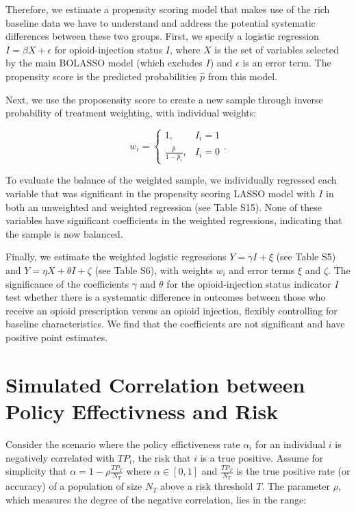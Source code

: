 \documentclass[9pt,twoside]{pnas-new}
\begin{document}
Therefore, we estimate a propensity scoring model that makes use of the rich baseline data we have to understand and address the potential systematic differences between these two groups. First, we specify a logistic regression $I = \beta X + \epsilon$ for opioid-injection status $I$, where $X$ is the set of variables selected by the main BOLASSO model (which excludes $I$) and $\epsilon$ is an error term. The propensity score is the predicted probabilities $\hat{p}$ from this model.

Next, we use the proposensity score to create a new sample through inverse probability of treatment weighting, with individual weights:

\[
w_i =
\begin{cases}
1, & I_i = 1 \\
\frac{\hat{p}}{1 - \hat{p}_i}, & I_i = 0
\end{cases}
.
\]

To evaluate the balance of the weighted sample, we individually regressed each variable that was significant in the propensity scoring LASSO model with $I$ in both an unweighted and weighted regression (see Table S15). None of these variables have significant coefficients in the weighted regressions, indicating that the sample is now balanced.

Finally, we estimate the weighted logistic regressions $Y = \gamma I + \xi$ (see Table S5) and $Y = \eta X + \theta I + \zeta$ (see Table S6), with weights $w_i$ and error terms $\xi$ and $\zeta$. The significance of the coefficients $\gamma$ and $\theta$ for the opioid-injection status indicator $I$ test whether there is a systematic difference in outcomes between those who receive an opioid prescription versus an opioid injection, flexibly controlling for baseline characteristics. We find that the coefficients are not significant and have positive point estimates.

\section{Simulated Correlation between Policy Effectivness and Risk}

Consider the scenario where the policy effictiveness rate $\alpha_i$ for an individual $i$ is negatively correlated with $TP_i$, the risk that $i$ is a true positive. Assume for simplicity that $\alpha = 1 - \rho \frac{TP_T}{N_T}$ where $\alpha \in [0,1]$ and $\frac{TP_T}{N_T}$ is the true positive rate (or accuracy) of a population of size $N_T$ above a risk threshold $T$. The parameter $\rho$, which measures the degree of the negative correlation, lies in the range:
\end{document}
